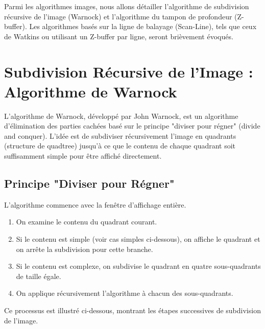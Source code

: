 \documentclass{article}
\begin{document}
Parmi les algorithmes images, nous allons détailler l'algorithme de subdivision récursive de l'image (Warnock) et l'algorithme du tampon de profondeur (Z-buffer). Les algorithmes basés sur la ligne de balayage (Scan-Line), tels que ceux de Watkins ou utilisant un Z-buffer par ligne, seront brièvement évoqués.

\section{Subdivision Récursive de l'Image : Algorithme de Warnock}

L'algorithme de Warnock, développé par John Warnock, est un algorithme d'élimination des parties cachées basé sur le principe "diviser pour régner" (divide and conquer). L'idée est de subdiviser récursivement l'image en quadrants (structure de quadtree) jusqu'à ce que le contenu de chaque quadrant soit suffisamment simple pour être affiché directement.

\subsection{Principe "Diviser pour Régner"}

L'algorithme commence avec la fenêtre d'affichage entière.
\begin{enumerate}
    \item On examine le contenu du quadrant courant.
    \item Si le contenu est simple (voir cas simples ci-dessous), on affiche le quadrant et on arrête la subdivision pour cette branche.
    \item Si le contenu est complexe, on subdivise le quadrant en quatre sous-quadrants de taille égale.
    \item On applique récursivement l'algorithme à chacun des sous-quadrants.
\end{enumerate}

Ce processus est illustré ci-dessous, montrant les étapes successives de subdivision de l'image.
\end{document}
